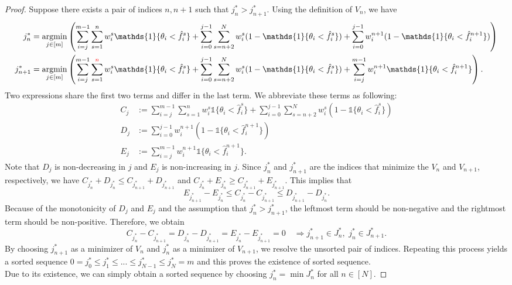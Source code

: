 \documentclass{article}
\newcommand{\indi}[1]{\mathds{1}\{#1\}}
\DeclareMathOperator*{\argmin}{argmin}
\begin{document}
\begin{proof}
Suppose there exists a pair of indices $n, n+1$ such that $j_n^* > j_{n+1}^*$. Using the definition of $V_n$, we have 
\begin{align*}
j_n^* &= \argmin_{j \in [m]} \left( \sum_{i=j}^{m-1} \sum_{s=1}^{n} w_i^s \indi{\theta_i < \hat{f}_i^s} + \sum_{i=0}^{j-1} \sum_{s=n+2}^{N}  w_i^s (1 - \indi{\theta_i < \hat{f}_i^s}) + \sum_{i=0}^{j-1} w_i^{n+1} (1 - \indi{\theta_i < \hat{f}_i^{n+1}})\right) \\
j_{n+1}^* &= \argmin_{j \in [m]} \left( \sum_{i=j}^{m-1} \sum_{s=1}^{{\color{red} n}} w_i^s \indi{\theta_i < \hat{f}_i^s} + \sum_{i=0}^{j-1} \sum_{s=n+2}^{N}  w_i^s (1 - \indi{\theta_i < \hat{f}_i^s}) + \sum_{i=j}^{m-1} w_i^{n+1}\indi{\theta_i < \hat{f}_i^{n+1}}\right).
\end{align*}
Two expressions share the first two terms and differ in the last term. We abbreviate these terms as following:
\begin{align*}
C_j & := \sum_{i=j}^{m-1} \sum_{s=1}^{n} w_i^s \indi{\theta_i < \hat{f}_i^s} + \sum_{i=0}^{j-1} \sum_{s=n+2}^{N}  w_i^s (1 - \indi{\theta_i < \hat{f}_i^s}) \\
D_j & := \sum_{i=0}^{j-1} w_i^{n+1} (1 - \indi{\theta_i < \hat{f}_i^{n+1}}) \\
E_j & := \sum_{i=j}^{m-1} w_i^{n+1}\indi{\theta_i < \hat{f}_i^{n+1}}.
\end{align*}
Note that $D_j$ is non-decreasing in $j$ and $E_j$ is non-increasing in $j$.
Since $j_n^*$ and $j_{n+1}^*$ are the indices that minimize the $V_n$ and $V_{n+1}$, respectively, we have $C_{j_n^*} + D_{j_n^*} \leq C_{j_{n+1}^*} + D_{j_{n+1}^*}$ and $C_{j_n^*} + E_{j_n^*} \geq C_{j_{n+1}^*} + E_{j_{n+1}^*}$. This implies that 
\[
E_{j_{n+1}^*} - E_{j_n^*} \leq C_{j_n^*} - C_{j_{n+1}^*} \leq D_{j_{n+1}^*} - D_{j_n^*}.
\]
Because of the monotonicity of $D_j$ and $E_j$ and the assumption that $j_n^* > j_{n+1}^*$, the leftmost term should be non-negative and the rightmost term should be non-positive. Therefore, we obtain 
\[
C_{j_n^*} - C_{j_{n+1}^*} = D_{j_n^*} - D_{j_{n+1}^*} = E_{j_n^*} - E_{j_{n+1}^*} = 0 \quad \Rightarrow j_{n+1}^* \in J_n^*, \,\, j_n^* \in J_{n+1}^*.
\]
By choosing $j_{n+1}^*$ as a minimizer of $V_n$ and $j_n^*$ as a minimizer of $V_{n+1}$, we resolve the unsorted pair of indices. Repeating this process yields a sorted sequence $0=j_0^* \leq j_1^* \leq ... \leq j_{N-1}^* \leq j_N^* = m$ and this proves the existence of sorted sequence.
\\
Due to its existence, we can simply obtain a sorted sequence by choosing $j_n^* = \min J_n^*$ for all $n \in [N]$.
\end{proof}
\end{document}
